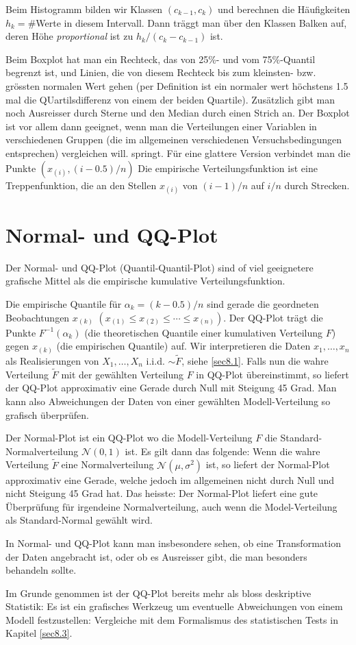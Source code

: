 Beim Histogramm bilden wir Klassen $(c_{k-1},c_k)$ und berechnen die Häufigkeiten $h_k=$\#Werte in diesem Intervall. Dann träggt man über den Klassen Balken auf, deren Höhe \emph{proportional} ist zu $h_k/(c_k-c_{k-1})$ ist.

Beim Boxplot hat man ein Rechteck, das von 25\%- und vom 75\%-Quantil begrenzt ist, und Linien, die von diesem Rechteck bis zum kleinsten- bzw. grössten \glqq normalen \grqq Wert gehen (per Definition ist ein normaler wert höchstens 1.5 mal die QUartilsdifferenz von einem der beiden Quartile). Zusätzlich gibt man noch Ausreisser durch Sterne und den Median durch einen Strich an. Der Boxplot ist vor allem dann geeignet, wenn man die Verteilungen einer Variablen in verschiedenen Gruppen (die im allgemeinen verschiedenen Versuchsbedingungen entsprechen) vergleichen will.
springt. Für eine glattere Version verbindet man die Punkte $(x_{(i)},(i-0.5)/n)$
Die empirische Verteilungsfunktion ist eine Treppenfunktion, die an den Stellen $x_{(i)}$ von $(i-1)/n$ auf $i/n$ durch Strecken.
\section{Normal- und QQ-Plot}
Der Normal- und QQ-Plot (\glqq Quantil-Quantil-Plot\grqq) sind of viel geeignetere grafische Mittel als die empirische kumulative Verteilungsfunktion.

Die empirische Quantile für $\alpha_k=(k-0.5)/n$ sind gerade die geordneten Beobachtungen $x_{(k)}$ $(x_{(1)}\leq x_{(2)}\leq \cdots \leq x_{(n)})$. Der QQ-Plot trägt die Punkte $F^{-1}(\alpha_k)$ (die theoretischen Quantile einer kumulativen Verteilung $F$) gegen $x_{(k)}$ (die empirischen Quantile) auf. Wir interpretieren die Daten $x_1,\ldots,x_n$ als Realisierungen von $X_1,\ldots,X_n$ i.i.d. $\sim \tilde{F}$, siehe \ref{sec8.1}. Falls nun die wahre Verteilung $\tilde{F}$ mit der gewählten Verteilung $F$ in QQ-Plot übereinstimmt, so liefert der QQ-Plot approximativ eine Gerade durch Null mit Steigung 45 Grad. Man kann also Abweichungen der Daten von einer gewählten Modell-Verteilung so grafisch überprüfen.

Der Normal-Plot ist ein QQ-Plot wo die Modell-Verteilung $F$ die Standard-Normalverteilung $\mathcal{N}(0,1)$ ist. Es gilt dann das folgende: Wenn die wahre Verteilung $\tilde{F}$ eine Normalverteilung $\mathcal{N}(\mu,\sigma^2)$ ist, so liefert der Normal-Plot approximativ eine Gerade, welche jedoch im allgemeinen nicht durch Null und nicht Steigung 45 Grad hat. Das heisste: Der Normal-Plot liefert eine gute Überprüfung für irgendeine Normalverteilung, auch wenn die Model-Verteilung als Standard-Normal gewählt wird.

In Normal- und QQ-Plot kann man insbesondere sehen, ob eine Transformation der Daten angebracht ist, oder ob es Ausreisser gibt, die man besonders behandeln sollte.

Im Grunde genommen ist der QQ-Plot bereits mehr als bloss deskriptive Statistik: Es ist ein grafisches Werkzeug um eventuelle Abweichungen von einem Modell festzustellen: Vergleiche mit dem Formalismus des statistischen Tests in Kapitel \ref{sec8.3}.
